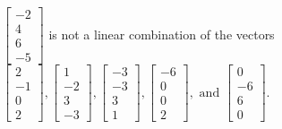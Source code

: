 \begin{exercise}
\begin{exerciseStatement}
  \end{exerciseStatement}
  \begin{exerciseAnswer}
   \(\left[\begin{array}{c}
-2 \\
4 \\
6 \\
-5
\end{array}\right]\) 
  	 is not  
	a linear combination of the vectors \(\left[\begin{array}{c}
2 \\
-1 \\
0 \\
2
\end{array}\right] , \left[\begin{array}{c}
1 \\
-2 \\
3 \\
-3
\end{array}\right] , \left[\begin{array}{c}
-3 \\
-3 \\
3 \\
1
\end{array}\right] , \left[\begin{array}{c}
-6 \\
0 \\
0 \\
2
\end{array}\right] , \text{ and } \left[\begin{array}{c}
0 \\
-6 \\
6 \\
0
\end{array}\right]\).

	
  


  \end{exerciseAnswer}
\end{exercise}